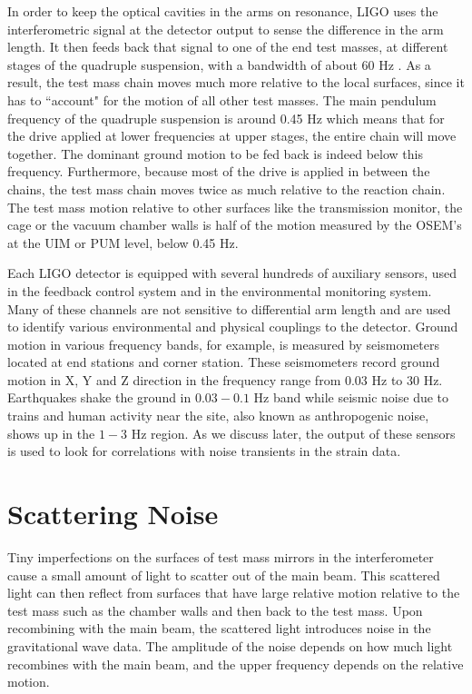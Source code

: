 \documentclass[12pt]{iopart}
\begin{document}
In order to keep the optical cavities in the arms on resonance, LIGO uses the interferometric signal at the detector output to sense the difference in the arm length. It then feeds back that signal to one of the end test masses, at different stages of the quadruple suspension, with a bandwidth of about 60 Hz \cite{Martynov_2016}. As a result, the test mass chain moves much more relative to the local surfaces, since it has to ``account" for the motion of all other test masses. The main pendulum frequency of the quadruple suspension is around 0.45 Hz which means that for the drive applied at lower frequencies at upper stages, the entire chain will move together. The dominant ground motion to be fed back is indeed below this frequency. Furthermore, because most of the drive is applied in between the chains, the test mass chain moves twice as much relative to the reaction chain. The test mass motion relative to other surfaces like the transmission monitor, the cage or the vacuum chamber walls is half of the motion measured by the OSEM's at the UIM or PUM level, below 0.45 Hz.

Each LIGO detector is equipped with several hundreds of auxiliary sensors, used in the feedback control system and in the environmental monitoring system. Many of these channels are not sensitive to differential arm length and are used to identify various environmental and physical couplings to the detector.
Ground motion in various frequency bands, for example, is measured by seismometers located at end stations and corner station. These seismometers record ground motion in X, Y and Z direction in the frequency range from 0.03 Hz to 30 Hz. Earthquakes shake the ground in $0.03-0.1$ Hz band while seismic noise due to trains and human activity near the site, also known as anthropogenic noise, shows up in the $1-3$ Hz region. As we discuss later, the output of these sensors is used to look for correlations with noise transients in the strain data.



 
\section{Scattering Noise}\label{scatteringnoise}
Tiny imperfections on the surfaces of test mass mirrors in the interferometer cause a small amount of light to scatter out of the main beam. This scattered light can then reflect from surfaces that have large relative motion relative to the test mass such as the chamber walls and then back to the test mass. Upon recombining with the main beam, the scattered light introduces noise in the gravitational wave data. The amplitude of the noise depends on how much light recombines with the main beam, and the upper frequency depends on the relative motion.
\end{document}
